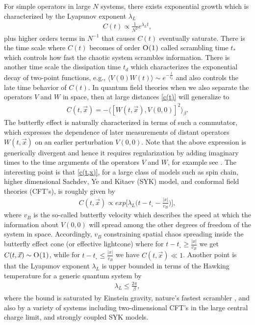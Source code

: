 \documentclass[preprintnumbers,aps,prd,longbibliography,nofootinbib,nobibnotes,amsmath,amssymb]{revtex4}
\begin{document}
 For simple operators in large $N$ systems, there exists  exponential growth which is characterized by the Lyapunov exponent $\lambda_{L}$ \cite{A. Kitaev1,A. Kitaev2}
  \begin{align}
 C(t)\propto \frac{1}{N^{2}} e^{\lambda_{L}t},
  \end{align}
 plus higher orders terms in $N^{-1}$ that causes $C(t)$ eventually saturate. There is the time scale where $C(t)$ becomes of order $ \textsc{O(1)}$ called scrambling time $t_{*}$ which controls how fast the chaotic system scrambles information. There is another time scale the dissipation time $t_d$ which characterizes the exponential decay of two-point functions, e.g., $\langle V(0)W(t)\rangle\sim e^{-\frac{t}{t_d}}$ and also controls the late time behavior of $ C(t)$.  In quantum field theories when we also separate the operators $V$ and $W$  in space, then at large distances \eqref{c(t)} will  generalize to 
  \begin{align}\label{c(t,x)}
C(t,\vec{x})= - \langle [W(t,\vec{x}),V(0,0)]^{2}\rangle _{\beta}.
 \end{align}
The butterfly effect is naturally characterized in terms of such a commutator, which expresses the dependence
of later measurements of distant operators $W(t,\vec{x})$ on an earlier perturbation $V(0,0)$. Note that the above expression is generically divergent and hence it  requires regularization by adding imaginary times to the time arguments of the operators $V$ and $W$, for example see \cite{Yoon:2019cql}. The interesting point is that \eqref{c(t,x)}, for a large class of models such as spin chain, higher dimensional Sachdev, Ye and Kitaev (SYK) model, and conformal field theories (CFT's), is roughly given by 
 \begin{align}
C(t,\vec{x})\propto  exp{\big[\lambda_{L}\big(t-t_{_*}-\frac{\vert x \vert}{v_B}\big)\big]},
  \end{align}
 where $v_B$ is the so-called butterfly velocity which describes the speed at which the  information about $V(0,0)$ will spread among the other degrees of freedom of the system in space. Accordingly, $v_B$  constraining spatial chaos spreading inside the butterfly effect cone (or effective lightcone) where for $t-t_{_*}\geq \frac{\vert x \vert}{v_B}$ we get $C(t,\vec{x})\sim \textsc{O(1)}$, while for $t-t_{_*}\leq \frac{\vert x \vert}{v_B}$ we have $C(t,\vec{x})\ll 1$.  Another point is that the Lyapunov exponent $\lambda_{L}$ is  upper bounded in terms of the Hawking temperature for a generic quantum system by  \cite{Maldacena:2015waa}
 \begin{align}
 \lambda_L \leq \frac{2\pi}{\beta },
 \end{align}
 where the bound is saturated by Einstein gravity, nature’s fastest scrambler \cite{Sekino:2008he}, and also by a variety of systems including  two-dimensional CFT's  in the large central charge limit, and strongly coupled SYK models.
 
\end{document}
